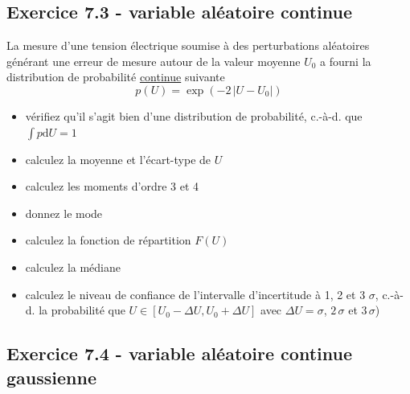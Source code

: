 \subsection*{Exercice 7.3 - variable aléatoire continue}

La mesure d'une tension électrique soumise à des perturbations aléatoires générant une erreur de mesure autour de la valeur moyenne $U_0$ a fourni la distribution de probabilité \underline{continue} suivante
$$
p(U)=\exp{(-2\,|U-U_0|)}
$$
\begin{itemize}
\item vérifiez qu'il s'agit bien d'une distribution de probabilité, c.-à-d. que $\int p\text{d}U=1$
\item calculez la moyenne et l'écart-type de $U$
\item calculez les moments d'ordre 3 et 4
\item donnez le mode
\item calculez la fonction de répartition $F(U)$
\item calculez la médiane
\item calculez le niveau de confiance de l'intervalle d'incertitude à 1, 2 et 3 $\sigma$, c.-à-d. la probabilité que $U\in[U_0-\Delta U,U_0+\Delta U]$ avec $\Delta U=\sigma$, $2\,\sigma$ et $3\,\sigma$)
\end{itemize}

\subsection*{Exercice 7.4 - variable aléatoire continue gaussienne}

